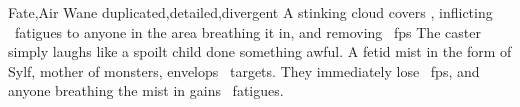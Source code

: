   {Fate,Air}%
  {Wane}%
  {duplicated,detailed,divergent}%
  {}%
  {A stinking cloud covers \spellArea, inflicting ~\glspl{fatigue} to anyone in the area breathing it in, and removing \rollConv~\glspl{fp}}%
  {
    The caster simply laughs like a spoilt child done something awful.
    A fetid mist in the form of Sylf, mother of monsters, envelops \spellArea\ targets.
    They immediately lose \rollConv~\glspl{fp}, and anyone breathing the mist in gains ~\glspl{fatigue}.
  }

